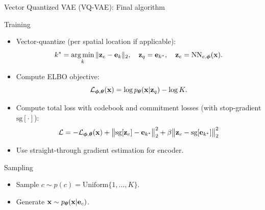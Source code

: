 \documentclass{beamer}
\renewcommand{\eqpause}{}
\begin{document}
\begin{frame}{Vector Quantized VAE (VQ-VAE): Final algorithm}
	\begin{block}{Training}
		\begin{itemize}
			\item Vector-quantize (per spatial location if applicable):
			\vspace{-0.3cm}
			\[
				k^* = \operatorname*{arg\,min}_k \|\mathbf{z}_e - \mathbf{e}_k\|_2, \quad \mathbf{z}_q = \mathbf{e}_{k^*}, \quad \mathbf{z}_e = \text{NN}_{e,\boldsymbol{\phi}}(\mathbf{x}).
			\]
			\vspace{-0.5cm}
			\item Compute ELBO objective:
			\vspace{-0.3cm}
			\[
				\mathcal{L}_{\boldsymbol{\phi}, \boldsymbol{\theta}}(\mathbf{x}) = \log p_{\boldsymbol{\theta}}(\mathbf{x} | \mathbf{z}_q) - \log K.
			\]
			\vspace{-0.5cm}
			\item Compute total loss with codebook and commitment losses (with stop-gradient $\text{sg}[\cdot]$):
			\vspace{-0.3cm}
			\[
				\mathcal{L} = - \mathcal{L}_{\boldsymbol{\phi}, \boldsymbol{\theta}}(\mathbf{x}) + \big\|\text{sg}[\mathbf{z}_e] - \mathbf{e}_{k^*}\big\|_2^2 + \beta \big\|\mathbf{z}_e - \text{sg}[\mathbf{e}_{k^*}]\big\|_2^2
			\]
			\vspace{-0.5cm}
			\item Use straight-through gradient estimation for encoder.
		\end{itemize}
	\end{block}
	\eqpause
	\vspace{-0.3cm}
	\begin{block}{Sampling}
		\begin{itemize}
			\item Sample $c \sim p(c) = \text{Uniform}\{1, \dots, K\}$.
			\item Generate $\mathbf{x} \sim p_{\boldsymbol{\theta}}(\mathbf{x} | \mathbf{e}_c)$.
		\end{itemize}
	\end{block}
\end{frame}
\end{document}
